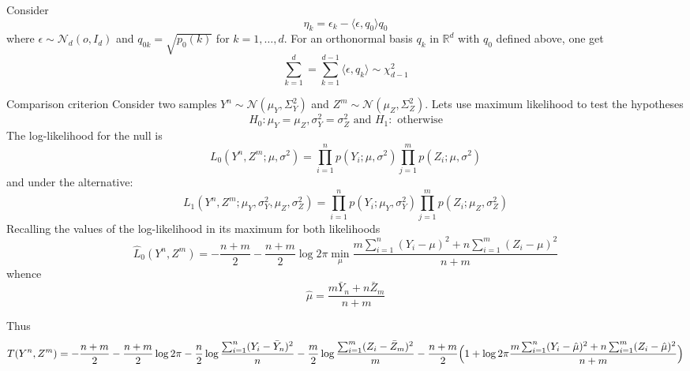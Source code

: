 \documentclass[a4paper]{article}
\newcommand{\Real}{\mathbb{R}}
\newcommand{\Ncal}{\mathcal{N}}
\begin{document}
Consider
\[\eta_k = \epsilon_k - \langle \epsilon, q_0\rangle q_0\]
where $\epsilon \sim \Ncal_d(o, I_d)$ and $q_{0k} = \sqrt{p_0(k)}$ for $k=1,\ldots,d$.
For an orthonormal basis $q_k$ in $\Real^d$ with $q_0$ defined above, one get
\[
\sum_{k=1}^d
= \sum_{k=1}^{d-1} \langle \epsilon, q_k \rangle
\sim \chi^2_{d-1}
\]

Comparison criterion
Consider two samples $Y^n\sim \Ncal(\mu_Y,\Sigma^2_Y)$ and $Z^m\sim \Ncal(\mu_Z,\Sigma^2_Z)$.
Lets use maximum likelihood to test the hypotheses
\[H_0: \mu_Y = \mu_Z, \sigma^2_Y = \sigma^2_Z\text{ and } H_1:\text{ otherwise}\]
The log-likelihood for the null is
\[
L_0(Y^n,Z^m;\mu,\sigma^2)
= \prod_{i=1}^n p(Y_i;\mu,\sigma^2)\prod_{j=1}^m p(Z_i;\mu,\sigma^2)
\]
and under the alternative:
\[
L_1(Y^n,Z^m;\mu_Y,\sigma^2_Y,\mu_Z,\sigma^2_Z)
= \prod_{i=1}^n p(Y_i;\mu_Y,\sigma^2_Y) \prod_{j=1}^m p(Z_i;\mu_Z,\sigma^2_Z)
\]
Recalling the values of the log-likelihood in its maximum for both likelihoods
\[
\hat{L}_0(Y^n,Z^m)
= -\frac{n+m}{2} - \frac{n+m}{2} \log 2\pi
	\min_\mu \frac{m\sum_{i=1}^n (Y_i - \mu)^2 + n\sum_{i=1}^m (Z_i - \mu)^2}{n+m}
\]
whence
\[ \hat{\mu} = \frac{m\bar{Y}_n + n\bar{Z}_m}{n+m} \]

Thus
\[
T(Y^n,Z^m)
= -\frac{n+m}{2} - \frac{n+m}{2} \log 2\pi
  - \frac{n}{2} \log \frac{\sum_{i=1}^n (Y_i - \bar{Y}_n)^2}{n}
  - \frac{m}{2} \log \frac{\sum_{i=1}^m (Z_i - \bar{Z}_m)^2}{m}
- \frac{n+m}{2}\Bigl( 1
	+ \log 2\pi \frac{m\sum_{i=1}^n (Y_i - \hat{\mu})^2 + n\sum_{i=1}^m (Z_i - \hat{\mu})^2}{n+m}
\Bigr)
\]


\end{document}
